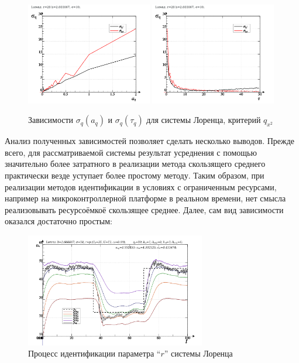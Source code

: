 \begin{figure}[h!]
\begin{center}
  \includegraphics[width=0.49\textwidth]{p/cha/lor/lor_qx2_tau-p_aq_sd.png}
  \hfill
  \includegraphics[width=0.49\textwidth]{p/cha/lor/lor_qx2_tau-p_tau_sd.png}
\end{center}
  \caption{Зависимости $\sigma_{q}(a_q)$ и $\sigma_{q}(\tau_q)$ для системы Лоренца, критерий $q_{x^2}$}
\label{atu:f:lor_qx2_tau}
\end{figure}

Анализ полученных зависимостей позволяет сделать
несколько выводов. Прежде всего, для рассматриваемой системы
результат усреднения с помощью значительно более затратного
в реализации метода скользящего среднего практически везде
уступает более простому методу. Таким образом,
при реализации методов идентификации в условиях с ограниченным ресурсами,
например на микроконтроллерной платформе в реальном времени,
нет смысла реализовывать ресурсоёмкоё скользящее среднее.
Далее, сам вид зависимости оказался достаточно простым:




\begin{figure}[h!]
  \centerline{\includegraphics[width=0.7\textwidth]{p/cha/lor/lor_m5pf-pl_n_sign.png} }
  \caption{Процесс идентификации параметра ``$r$'' системы Лоренца}
  \label{atu:f:lor_id_mp5_sign}
\end{figure}

